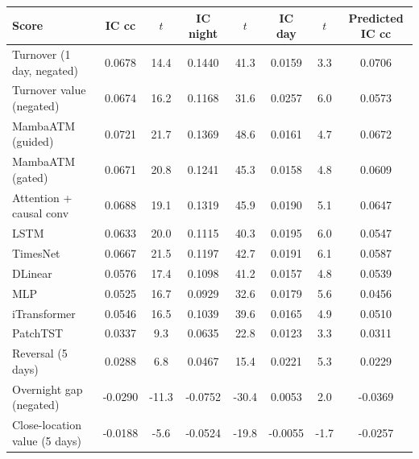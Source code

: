 {\tiny
\setlength{\tabcolsep}{1.5pt}
\begin{tabular}{lccccccc}
\toprule
\textbf{Score} & \textbf{IC cc} & \textbf{$t$} & \textbf{IC night} & \textbf{$t$} & \textbf{IC day} & \textbf{$t$} & \textbf{Predicted IC cc} \\
\midrule
Turnover (1 day, negated) & 0.0678 & 14.4 & 0.1440 & 41.3 & 0.0159 & 3.3 & 0.0706 \\
Turnover value (negated) & 0.0674 & 16.2 & 0.1168 & 31.6 & 0.0257 & 6.0 & 0.0573 \\
MambaATM (guided) & 0.0721 & 21.7 & 0.1369 & 48.6 & 0.0161 & 4.7 & 0.0672 \\
MambaATM (gated) & 0.0671 & 20.8 & 0.1241 & 45.3 & 0.0158 & 4.8 & 0.0609 \\
Attention + causal conv & 0.0688 & 19.1 & 0.1319 & 45.9 & 0.0190 & 5.1 & 0.0647 \\
LSTM & 0.0633 & 20.0 & 0.1115 & 40.3 & 0.0195 & 6.0 & 0.0547 \\
TimesNet & 0.0667 & 21.5 & 0.1197 & 42.7 & 0.0191 & 6.1 & 0.0587 \\
DLinear & 0.0576 & 17.4 & 0.1098 & 41.2 & 0.0157 & 4.8 & 0.0539 \\
MLP & 0.0525 & 16.7 & 0.0929 & 32.6 & 0.0179 & 5.6 & 0.0456 \\
iTransformer & 0.0546 & 16.5 & 0.1039 & 39.6 & 0.0165 & 4.9 & 0.0510 \\
PatchTST & 0.0337 & 9.3 & 0.0635 & 22.8 & 0.0123 & 3.3 & 0.0311 \\
Reversal (5 days) & 0.0288 & 6.8 & 0.0467 & 15.4 & 0.0221 & 5.3 & 0.0229 \\
Overnight gap (negated) & -0.0290 & -11.3 & -0.0752 & -30.4 & 0.0053 & 2.0 & -0.0369 \\
Close-location value (5 days) & -0.0188 & -5.6 & -0.0524 & -19.8 & -0.0055 & -1.7 & -0.0257 \\
\bottomrule
\end{tabular}
}
